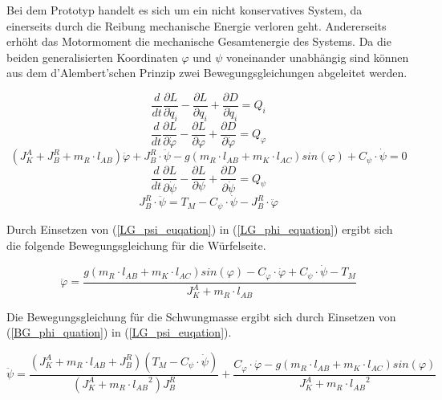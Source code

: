 Bei dem Prototyp handelt es sich um ein nicht konservatives System, da einerseits durch die Reibung mechanische Energie verloren geht. Andererseits erhöht das Motormoment die mechanische Gesamtenergie des Systems. Da die beiden generalisierten Koordinaten $\varphi$ und $\psi$ voneinander unabhängig sind können aus dem d'Alembert'schen Prinzip zwei Bewegungsgleichungen abgeleitet werden.

\begin{equation}
\frac{d}{dt}\frac{\partial L}{\partial \dot{q}_i}-\frac{\partial L}{\partial q_i} + \frac{\partial D}{\partial \dot{q}_i} = Q_i
\end{equation}
\begin{equation}
\frac{d}{dt}\frac{\partial L}{\partial \dot{\varphi}}-\frac{\partial L}{\partial \varphi} + \frac{\partial D}{\partial \dot{\varphi}} = Q_{\varphi} 
\end{equation}
\begin{equation}
\label{LG_phi_equation}
(J^A_K + J^R_B + m_R \cdot l_{AB})\ddot{\varphi} + J^R_B \cdot \ddot{\psi} - g(m_R \cdot l_{AB} + m_K \cdot l_{AC})sin(\varphi) + C_{\psi} \cdot \dot{\psi} = 0
\end{equation}
\begin{equation}
\frac{d}{dt}\frac{\partial L}{\partial \dot{\psi}}-\frac{\partial L}{\partial \psi} + \frac{\partial D}{\partial \dot{\psi}} = Q_{\psi} 
\end{equation}
\begin{equation}
\label{LG_psi_euqation}
J^R_B \cdot \ddot{\psi} = T_M - C_{\psi} \cdot \dot{\psi} - J^R_B \cdot \ddot{\varphi}
\end{equation}

Durch Einsetzen von (\ref{LG_psi_euqation}) in (\ref{LG_phi_equation}) ergibt sich die folgende Bewegungsgleichung für die Würfelseite.

\begin{equation}
\label{BG_phi_quation}
\ddot{\varphi} = \frac{g(m_R \cdot l_{AB} + m_K \cdot l_{AC})sin(\varphi) - C_{\varphi} \cdot \dot{\varphi} + C_{\psi} \cdot \dot{\psi} - T_M}{J^A_K + m_R \cdot l_{AB}}
\end{equation}

Die Bewegungsgleichung für die Schwungmasse ergibt sich durch Einsetzen von (\ref{BG_phi_quation}) in (\ref{LG_psi_euqation}).

\begin{equation}
\label{BG_psi_equation}
\ddot{\psi} = \frac{(J^A_K + m_R \cdot l_{AB} + J^R_B)(T_M - C_{\psi} \cdot \dot{\psi})}{(J^A_K + m_R \cdot {l_{AB}}^2)J^R_B} + \frac{C_{\varphi} \cdot \dot{\varphi} - g(m_R \cdot l_{AB} + m_K \cdot l_{AC})sin(\varphi)}{J^A_K + m_R \cdot {l_{AB}}^2}
\end{equation}